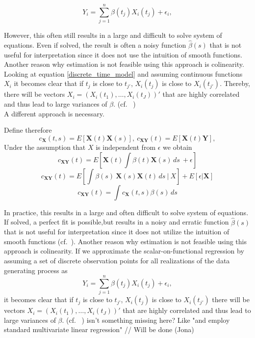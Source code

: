 \documentclass[11pt,twoside,a4paper]{article}
\begin{document}
    \begin{equation}\label{discrete_time_model}
    	Y_i = \sum_{j = 1}^{n} \beta(t_{j})X_i(t_{j}) + \epsilon_{i},
    \end{equation}

    However, this often still results in a large and difficult to solve system of equations. Even if solved, the result is often a noisy function $\hat{\beta}(s)$ that is not useful for interpretation since it does not use the intuition of smooth functions. Another reason why estimation is not feasible using this approach is colinearity.
    Looking at equation \ref{discrete_time_model} and assuming continuous functions $X_i$ it becomes clear that if $t_{j}$ is close to $t_{j'}$, $X_{i}(t_{j})$ is close to $X_{i}(t_{j'})$. Thereby, there will be vectors $X_{i} = (X_i(t_1), \dots, X_i(t_J))'$ that are highly correlated and thus lead to large variances of $\beta$. (cf. ~\cite{kokoszka_introduction_2017})\\
    A different approach is necessary.
    
    Define therefore
    \begin{equation}
  	c_{\mathbf{X}}(t,s) = E[\mathbf{X}(t)\mathbf{X}(s)],\: c_{\mathbf{X}\mathbf{Y}}(t) = E[\mathbf{X}(t)\mathbf{Y}], 
    \end{equation}
   Under the assumption that $X$ is independent from $\epsilon$ we obtain
   \begin{equation}
     c_{\mathbf{X}\mathbf{Y}}(t) = E[\mathbf{X}(t)\int \beta(t)\mathbf{X}(s) \,ds \ +\epsilon]
   \end{equation}
    \begin{equation}
     c_{\mathbf{X}\mathbf{Y}}(t) = E[\int \beta(s) \: \mathbf{X}(s)\mathbf{X}(t) \, ds \: | \: X]  + E[\epsilon |\mathbf{X}]
  	\end{equation}
   	\begin{equation}
    	c_{\mathbf{X}\mathbf{Y}}(t) = \int c_{\mathbf{X}}(t,s) \beta(s) \,ds
   \end{equation}
   
   In practice, this results in a large and often difficult to solve system of equations. If solved, a  perfect fit is possible,but results in a noisy and erratic function $\hat{\beta}(s)$ that is not useful for interpretation since it does not utilize the intuition of smooth functions (cf.~\cite{horvath_inference_2012}). Another reason why estimation is not feasible using this approach is colinearity.
   If we approximate the scalar-on-functional regression by assuming a set of discrete observation points for all realizations of the data generating process as
  	\begin{equation}
     Y_i = \sum_{j = 1}^{n} \beta(t_{j})X_i(t_{j}) + \epsilon_{i},
    \end{equation} it becomes clear that if $t_{j}$ is close to $t_{j'}$, $X_{i}(t_{j})$ is close to $X_{i}(t_{j'})$ there will be vectors $X_{i} = (X_i(t_1), \dots, X_i(t_J))'$ that are highly correlated and thus lead to large variances of $\beta$. (cf. ~\cite{kokoszka_introduction_2017}) {\color{red} isn't something missing here? Like "and employ standard multivariate linear regression" // Will be done (Jona)}
   
\end{document}
